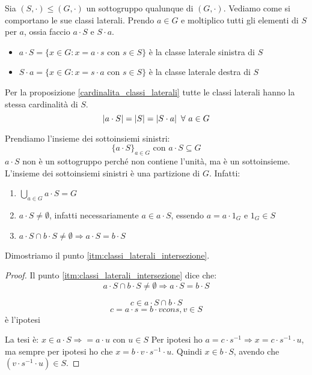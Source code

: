 Sia $(S, \cdot) \le (G, \cdot)$ un sottogruppo qualunque di $(G, \cdot)$. Vediamo come si comportano le sue classi laterali. Prendo $a \in G$ e moltiplico tutti gli elementi di $S$ per $a$, ossia faccio $a \cdot S$ e $S \cdot a$.
\begin{itemize}
    \item $a \cdot S = \{ x \in G : x = a \cdot s \text{ con } s \in S \}$ \`e la classe laterale sinistra di $S$
    \item $S \cdot a = \{ x \in G : x = s \cdot a \text{ con } s \in S \}$ \`e la classe laterale destra di $S$
\end{itemize}

Per la proposizione \ref{cardinalita_classi_laterali} tutte le classi laterali hanno la stessa cardinalit\`a di $S$.
\[
\abs{a \cdot S} = \abs{S} = \abs{S \cdot a} \forall a \in G
\]

Prendiamo l'insieme dei sottoinsiemi sinistri:
\[
\{ a \cdot S\}_{a \in G} \text{ con } a \cdot S \subseteq G
\]
$a \cdot S$ non \`e un sottogruppo perch\'e non contiene l'unit\`a, ma \`e un sottoinsieme. L'insieme dei sottoinsiemi sinistri \`e una partizione di $G$. Infatti:
\begin{enumerate}
    \item $\bigcup_{a \in G} a \cdot S = G$
    \item $a \cdot S \neq \emptyset$, infatti necessariamente $a \in a \cdot S$, essendo $a = a \cdot 1_G$ e $1_G \in S$
    \item\label{itm:classi_laterali_intersezione} $a \cdot S \cap b \cdot S \neq \emptyset \Rightarrow a \cdot S = b \cdot S$
\end{enumerate}


Dimostriamo il punto \ref{itm:classi_laterali_intersezione}.
\begin{proof}
Il punto \ref{itm:classi_laterali_intersezione} dice che:
\[
a \cdot S \cap b \cdot S \neq \emptyset \Rightarrow a \cdot S = b \cdot S
\]

\[
c \in a \cdot S \cap b \cdot S
\]
\[
c = a \cdot s = b \cdot v con s, v \in S
\]
\`e l'ipotesi

La tesi \`e:
$x \in a \cdot S \Rightarrow = a \cdot u$ con $u \in S$
Per ipotesi ho $a = c \cdot s^{-1} \Rightarrow x = c \cdot s^{-1} \cdot u$, ma sempre per ipotesi ho che $x = b \cdot v \cdot s^{-1} \cdot u$. Quindi $x \in b \cdot S$, avendo che $(v \cdot s^{-1} \cdot u) \in S$.
\end{proof}

